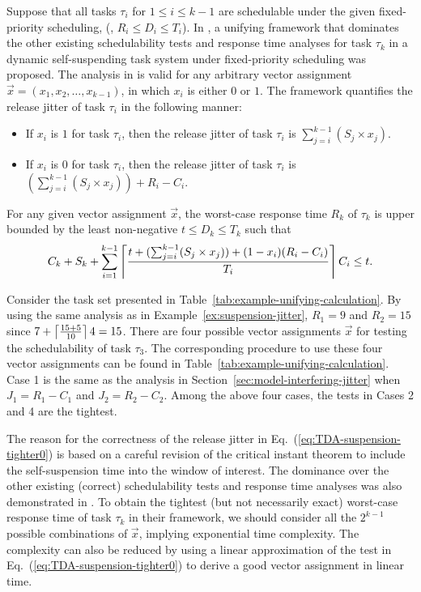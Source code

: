   Suppose that all tasks $\tau_i$ for $1 \leq i \leq k-1$ are
  schedulable under the given fixed-priority scheduling, (\ie, $R_i
  \leq D_i \leq T_i$). In \cite{ChenECRTS2016-suspension}, a unifying framework that dominates the other existing
  schedulability tests and response time analyses for task $\tau_k$ in
  a dynamic self-suspending task system under fixed-priority
  scheduling was proposed. The analysis in \cite{ChenECRTS2016-suspension} is valid
  for any arbitrary vector assignment $\vec{x} = (x_1, x_2, \ldots,
  x_{k-1})$, in which $x_i$ is either $0$ or $1$. The framework
  quantifies the release jitter of task $\tau_i$ in the following
  manner:
  \begin{itemize}
  \item If $x_i$ is $1$ for task $\tau_i$, then the release jitter of
    task $\tau_i$ is $\sum_{j=i}^{k-1} (S_j \times x_j)$. 
  \item If $x_i$ is $0$ for task $\tau_i$, then the release jitter of
    task $\tau_i$ is $(\sum_{j=i}^{k-1} (S_j \times x_j)) + R_i-C_i$. 
  \end{itemize}
  For any given vector assignment $\vec{x}$, the worst-case response
  time $R_k$ of $\tau_k$ is upper bounded by the least non-negative $t
  \leq D_k \leq T_k$ such that
  {\small \begin{equation} \label{eq:TDA-suspension-tighter0} C_k +
      S_k + \sum_{i=1}^{k-1}\left\lceil{\frac{t+ (\sum_{j=i}^{k-1} (S_j
          \times x_j))+(1-x_i)(R_i-C_i)}{T_i}}\right\rceil C_i \leq t.
     \end{equation}}

\begin{example} 
\label{ex:rationale_unifying}  
Consider the task set presented in
Table~\ref{tab:example-unifying-calculation}.  By using the same
analysis as in Example~\ref{ex:suspension-jitter}, $R_1=9$ and
$R_2=15$ since $7+\left\lceil{\frac{15+5}{10}}\right\rceil4 = 15$.  There are four
possible vector assignments $\vec{x}$ for testing the schedulability
of task $\tau_3$. The corresponding procedure to use these four vector
assignments can be found in
Table~\ref{tab:example-unifying-calculation}.  Case 1 is the same as
the analysis in Section~\ref{sec:model-interfering-jitter} when $J_1 =
R_1-C_1$ and $J_2 = R_2-C_2$.  Among the above four cases, the tests
in Cases 2 and 4 are the tightest.
\hfill\myendproof
\end{example}

The reason for the correctness of the release jitter in
Eq.~(\ref{eq:TDA-suspension-tighter0}) is based on a careful revision
of the critical instant theorem to include the self-suspension time
into the window of interest. The dominance over the
other existing (correct) schedulability tests and response time
analyses was also demonstrated in \cite{ChenECRTS2016-suspension}. To obtain the tightest (but not necessarily exact)  worst-case response time of task
$\tau_k$ in their framework, we should consider all the $2^{k-1}$ possible combinations
of $\vec{x}$, implying exponential time complexity. The complexity can
also be reduced by using a linear approximation of the test in
Eq.~(\ref{eq:TDA-suspension-tighter0}) to derive a good vector
assignment in linear time.


